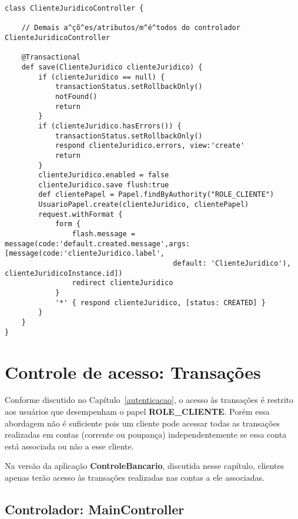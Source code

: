 \begin{lstlisting}[caption=Controlador   {\bf    ClienteJuridico}   (ação   {\bf
      save()}), frame=trBL, float=htbp, label=codSaveJuridico] 
class ClienteJuridicoController {

    // Demais a^çõ^es/atributos/m^é^todos do controlador ClienteJuridicoController

    @Transactional
    def save(ClienteJuridico clienteJuridico) {
        if (clienteJuridico == null) {
            transactionStatus.setRollbackOnly()
            notFound()
            return
        }
        if (clienteJuridico.hasErrors()) {
            transactionStatus.setRollbackOnly()
            respond clienteJuridico.errors, view:'create'
            return
        }
        clienteJuridico.enabled = false
        clienteJuridico.save flush:true
        def clientePapel = Papel.findByAuthority("ROLE_CLIENTE")
        UsuarioPapel.create(clienteJuridico, clientePapel)
        request.withFormat {
            form {
                flash.message = message(code:'default.created.message',args: [message(code:'clienteJuridico.label', 
                                        default: 'ClienteJuridico'), clienteJuridicoInstance.id])
                redirect clienteJuridico
            }
            '*' { respond clienteJuridico, [status: CREATED] }
        }
    }
}
\end{lstlisting}

\newpage

\section{Controle de acesso: Transações}

\vspace{0.5cm}

Conforme  discutido no  Capítulo~\ref{autenticacao},  o acesso  às transações  é
restrito aos  usuários que desempenham  o papel {\bf ROLE\_CLIENTE}.  Porém essa
abordagem  não é suficiente  pois um  cliente pode  acessar todas  as transações
realizadas em contas (corrente ou poupança) independentemente se essa conta está
associada ou não a esse cliente.

\vspace{0.2cm}

Na  versão  da  aplicação  {\bf  ControleBancario},  discutida  nesse  capítulo,
clientes  apenas  terão  acesso  às  transações  realizadas  nas  contas  a  ele
associadas.  

\subsection{Controlador: MainController}

